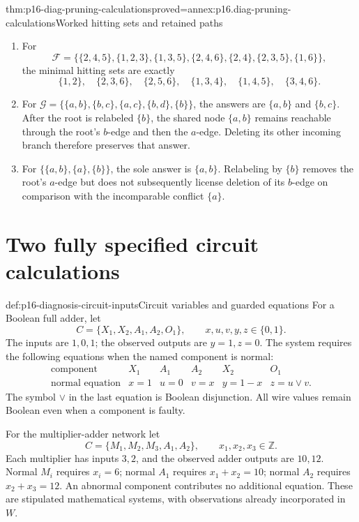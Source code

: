 \begin{hbtheorem}{thm:p16-diag-pruning-calculations}{proved=annex:p16.diag-pruning-calculations}{Worked hitting sets and retained paths}
\begin{enumerate}
\item For
 \[
 \mathcal F=\{\{2,4,5\},\{1,2,3\},\{1,3,5\},
                 \{2,4,6\},\{2,4\},\{2,3,5\},\{1,6\}\},
 \]
 the minimal hitting sets are exactly
 \[
 \{1,2\},\quad\{2,3,6\},\quad\{2,5,6\},\quad
 \{1,3,4\},\quad\{1,4,5\},\quad\{3,4,6\}.
 \]
\item For
 \(\mathcal G=\{\{a,b\},\{b,c\},\{a,c\},\{b,d\},\{b\}\}\),
 the answers are \(\{a,b\}\) and \(\{b,c\}\).
 After the root is relabeled \(\{b\}\), the shared node
 \(\{a,b\}\) remains reachable through the root's \(b\)-edge
 and then the \(a\)-edge. Deleting its other incoming branch
 therefore preserves that answer.
\item For \(\{\{a,b\},\{a\},\{b\}\}\), the sole answer is
 \(\{a,b\}\). Relabeling by \(\{b\}\) removes the root's
 \(a\)-edge but does not subsequently license deletion of
 its \(b\)-edge on comparison with the incomparable
 conflict \(\{a\}\).
\end{enumerate}
\end{hbtheorem}

\section{Two fully specified circuit calculations}
\label{sec:p16-diagnosis-circuits}

\begin{hbdefinition}{def:p16-diagnosis-circuit-inputs}{Circuit variables and guarded equations}
For a Boolean full adder, let
\[
 C=\{X_1,X_2,A_1,A_2,O_1\},\qquad x,u,v,y,z\in\{0,1\}.
\]
The inputs are \(1,0,1\); the observed outputs are \(y=1,z=0\).
The system requires the following equations when the named
component is normal:
\[
\begin{array}{c|ccccc}
 \text{component}&X_1&A_1&A_2&X_2&O_1\\ \hline
 \text{normal equation}&x=1&u=0&v=x&y=1-x&z=u\lor v .
\end{array}
\]
The symbol \(\lor\) in the last equation is Boolean disjunction.
All wire values remain Boolean even when a component is faulty.

For the multiplier-adder network let
\[
 C=\{M_1,M_2,M_3,A_1,A_2\},\qquad x_1,x_2,x_3\in\mathbb Z .
\]
Each multiplier has inputs \(3,2\), and the observed adder
outputs are \(10,12\). Normal \(M_i\) requires \(x_i=6\);
normal \(A_1\) requires \(x_1+x_2=10\); normal \(A_2\)
requires \(x_2+x_3=12\). An abnormal component contributes
no additional equation. These are stipulated mathematical
systems, with observations already incorporated in \(W\).
\end{hbdefinition}

